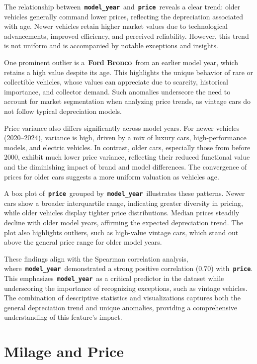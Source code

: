 \documentclass[a4paper,oneside,bibliography=totoc]{scrbook}
\begin{document}
The relationship between~\textbf{\texttt{model\_year}}~and~\textbf{\texttt{price}}~reveals a clear trend: older vehicles generally command lower prices, reflecting the depreciation associated with age. Newer vehicles retain higher market values due to technological advancements, improved efficiency, and perceived reliability. However, this trend is not uniform and is accompanied by notable exceptions and insights.

One prominent outlier is a~\textbf{Ford Bronco}~from an earlier model year, which retains a high value despite its age. This highlights the unique behavior of rare or collectible vehicles, whose values can appreciate due to scarcity, historical importance, and collector demand. Such anomalies underscore the need to account for market segmentation when analyzing price trends, as vintage cars do not follow typical depreciation models.

Price variance also differs significantly across model years. For newer vehicles (2020--2024), variance is high, driven by a mix of luxury cars, high-performance models, and electric vehicles. In contrast, older cars, especially those from before 2000, exhibit much lower price variance, reflecting their reduced functional value and the diminishing impact of brand and model differences. The convergence of prices for older cars suggests a more uniform valuation as vehicles age.

A box plot of~\textbf{\texttt{price}}~grouped by~\textbf{\texttt{model\_year}}~illustrates these patterns. Newer cars show a broader interquartile range, indicating greater diversity in pricing, while older vehicles display tighter price distributions. Median prices steadily decline with older model years, affirming the expected depreciation trend. The plot also highlights outliers, such as high-value vintage cars, which stand out above the general price range for older model years.

These findings align with the Spearman correlation analysis, where~\textbf{\texttt{model\_year}}~demonstrated a strong positive correlation (0.70) with~\textbf{\texttt{price}}. This emphasizes~\textbf{\texttt{model\_year}}~as a critical predictor in the dataset while underscoring the importance of recognizing exceptions, such as vintage vehicles. The combination of descriptive statistics and visualizations captures both the general depreciation trend and unique anomalies, providing a comprehensive understanding of this feature's impact.

\section{Milage and Price}
\label{sec:milageAndPrice}
\end{document}
